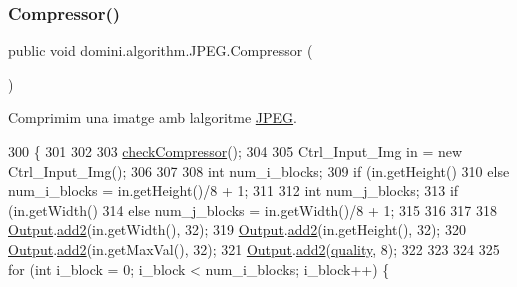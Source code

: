\subsubsection{\texorpdfstring{Compressor()}{Compressor()}}
{\footnotesize\ttfamily public void domini.\+algorithm.\+J\+P\+E\+G.\+Compressor (\begin{DoxyParamCaption}{ }\end{DoxyParamCaption})\hspace{0.3cm}{\ttfamily [inline]}}



Comprimim una imatge amb l\textquotesingle{}algoritme \hyperlink{classdomini_1_1algorithm_1_1JPEG}{J\+P\+EG}. 


\begin{DoxyCode}
300                              \{
301         
302 
303         \hyperlink{classdomini_1_1algorithm_1_1Algorithm_a070b7e7dcc453b03751d265beae5306c}{checkCompressor}();
304         
305         Ctrl\_Input\_Img in = \textcolor{keyword}{new} Ctrl\_Input\_Img();
306 
307         
308         \textcolor{keywordtype}{int} num\_i\_blocks;
309         \textcolor{keywordflow}{if} (in.getHeight()%
310         \textcolor{keywordflow}{else} num\_i\_blocks = in.getHeight()/8 + 1;
311         
312         \textcolor{keywordtype}{int} num\_j\_blocks;
313         \textcolor{keywordflow}{if} (in.getWidth()%
314         \textcolor{keywordflow}{else} num\_j\_blocks = in.getWidth()/8 + 1;
315         
316         
317 
318         \hyperlink{classdomini_1_1algorithm_1_1Algorithm_a4de9955411c656325adc391ef570c082}{Output}.\hyperlink{classpersistencia_1_1output_1_1Ctrl__Output_ad4738467c2312b0e079c14003e548dd6}{add2}(in.getWidth(), 32);
319         \hyperlink{classdomini_1_1algorithm_1_1Algorithm_a4de9955411c656325adc391ef570c082}{Output}.\hyperlink{classpersistencia_1_1output_1_1Ctrl__Output_ad4738467c2312b0e079c14003e548dd6}{add2}(in.getHeight(), 32);
320         \hyperlink{classdomini_1_1algorithm_1_1Algorithm_a4de9955411c656325adc391ef570c082}{Output}.\hyperlink{classpersistencia_1_1output_1_1Ctrl__Output_ad4738467c2312b0e079c14003e548dd6}{add2}(in.getMaxVal(), 32);
321         \hyperlink{classdomini_1_1algorithm_1_1Algorithm_a4de9955411c656325adc391ef570c082}{Output}.\hyperlink{classpersistencia_1_1output_1_1Ctrl__Output_ad4738467c2312b0e079c14003e548dd6}{add2}(\hyperlink{classdomini_1_1algorithm_1_1JPEG_ae80176d5ff56e613643db55e21c513da}{quality}, 8);
322 
323         
324 
325         \textcolor{keywordflow}{for} (\textcolor{keywordtype}{int} i\_block = 0; i\_block < num\_i\_blocks; i\_block++)  \{

\end{DoxyCode}
